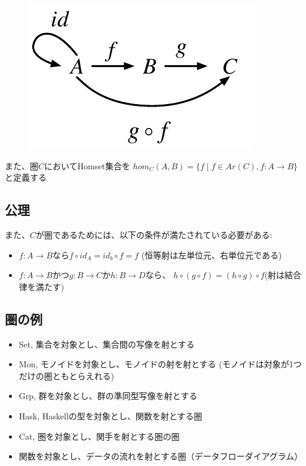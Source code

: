 \documentclass{jsarticle}
\begin{document}
\begin{figure}[htbp]
    \centering
    \includegraphics{diag_comp.pdf} 
\end{figure}

また、圏$C$においてHomset集合を
$hom_C(A,B)=\{f \mid f \in Ar(C), f: A \to B\}$と定義する

\subsection{公理}
また、$C$が圏であるためには、以下の条件が満たされている必要がある:
\begin{itemize}
    \item $f:A \to B$なら$f \circ id_A = id_b \circ f = f$
        (恒等射は左単位元、右単位元である)
    \item $f:A \to B$かつ$g: B \to C$か$h: B \to D$なら、
        $h \circ (g \circ f)=(h\circ g) \circ f$(射は結合律を満たす)
\end{itemize}

\subsection{圏の例}
\begin{itemize}
    \item Set, 集合を対象とし、集合間の写像を射とする
    \item Mon, モノイドを対象とし、モノイドの射を射とする
        (モノイドは対象が1つだけの圏ともとらえれる)
    \item Grp, 群を対象とし、群の準同型写像を射とする
    \item Hask, Haskellの型を対象とし、関数を射とする圏
    \item Cat, 圏を対象とし、関手を射とする圏の圏
    \item 関数を対象とし、データの流れを射とする圏（データフローダイアグラム）
\end{itemize}
\end{document}
